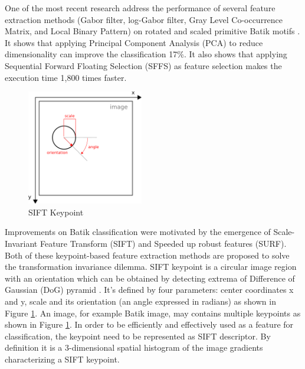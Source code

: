 \documentclass[conference, compsoc]{IEEEtran}
\begin{document}
One of the most recent research address the performance of several feature extraction methods (Gabor filter, log-Gabor filter, Gray Level Co-occurrence Matrix, and Local Binary Pattern) on rotated and scaled primitive Batik motifs \cite{fahmi2016feature}. It shows that applying Principal Component Analysis (PCA) to reduce dimensionality can improve the classification 17\%. It also shows that applying Sequential Forward Floating Selection (SFFS) as feature selection makes the execution time 1,800 times faster.

\begin{figure}[h]
	\begin{center}
		\includegraphics[width=2.0in]{../sift-keypoint}
		\renewcommand{\figurename}{Fig.}		
		\caption{SIFT Keypoint}
		\label{fig_keypoint}
	\end{center}
\end{figure}


Improvements on Batik classification were motivated by the emergence of Scale-Invariant Feature Transform (SIFT)\cite{lowe2004distinctive} and Speeded up robust features (SURF)\cite{bay2006surf}. Both of these keypoint-based feature extraction methods are proposed to solve the transformation invariance dilemma. SIFT keypoint is a circular image region with an orientation which can be obtained by detecting extrema of Difference of Gaussian (DoG) pyramid \cite{lowe2004distinctive}. It's defined by four parameters: center coordinates x and y, scale and its orientation (an angle expressed in radians) as shown in Figure \ref{fig_keypoint}. An image, for example Batik image, may contains multiple keypoints as shown in Figure \ref{fig_keypoint}. In order to be efficiently and effectively used as a feature for classification, the keypoint need to be represented as SIFT descriptor. By definition it is a 3-dimensional spatial histogram of the image gradients characterizing a SIFT keypoint.
\end{document}
